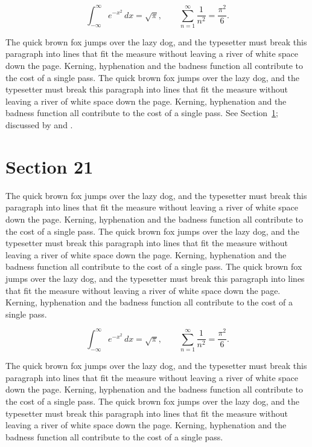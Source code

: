 \documentclass{article}
\begin{document}
\begin{equation}\label{eq:20}
\int_{-\infty}^{\infty} e^{-x^{2}}\,dx = \sqrt{\pi}, \qquad
\sum_{n=1}^{\infty} \frac{1}{n^{2}} = \frac{\pi^{2}}{6}.
\end{equation}

The quick brown fox jumps over the lazy dog, and the typesetter must break this paragraph into lines that fit the measure without leaving a river of white space down the page. Kerning, hyphenation and the badness function all contribute to the cost of a single pass. The quick brown fox jumps over the lazy dog, and the typesetter must break this paragraph into lines that fit the measure without leaving a river of white space down the page. Kerning, hyphenation and the badness function all contribute to the cost of a single pass. 
See Section~\ref{sec:21}; discussed by \textcite{k1} and \textcite{l3}.
\section{Section 21}
\label{sec:21}
The quick brown fox jumps over the lazy dog, and the typesetter must break this paragraph into lines that fit the measure without leaving a river of white space down the page. Kerning, hyphenation and the badness function all contribute to the cost of a single pass. The quick brown fox jumps over the lazy dog, and the typesetter must break this paragraph into lines that fit the measure without leaving a river of white space down the page. Kerning, hyphenation and the badness function all contribute to the cost of a single pass. The quick brown fox jumps over the lazy dog, and the typesetter must break this paragraph into lines that fit the measure without leaving a river of white space down the page. Kerning, hyphenation and the badness function all contribute to the cost of a single pass. 

\begin{equation}\label{eq:21}
\int_{-\infty}^{\infty} e^{-x^{2}}\,dx = \sqrt{\pi}, \qquad
\sum_{n=1}^{\infty} \frac{1}{n^{2}} = \frac{\pi^{2}}{6}.
\end{equation}

The quick brown fox jumps over the lazy dog, and the typesetter must break this paragraph into lines that fit the measure without leaving a river of white space down the page. Kerning, hyphenation and the badness function all contribute to the cost of a single pass. The quick brown fox jumps over the lazy dog, and the typesetter must break this paragraph into lines that fit the measure without leaving a river of white space down the page. Kerning, hyphenation and the badness function all contribute to the cost of a single pass. 
\end{document}
